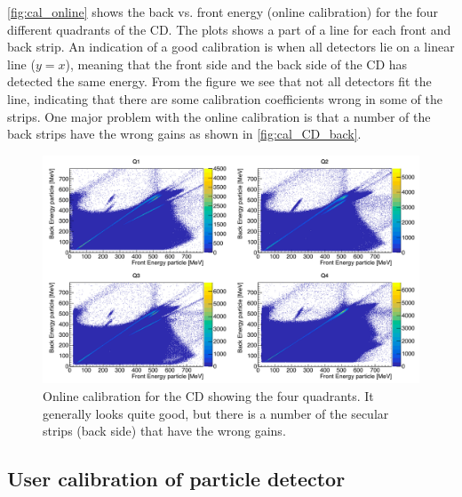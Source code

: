 \documentclass[twoside,english]{uiofysmaster/uiofysmaster}
\begin{document}
\autoref{fig:cal_online} shows the back vs. front energy (online calibration) for the four different quadrants of the CD. 
The plots shows a part of a line for each front and back strip. An indication of a good calibration is when all detectors lie on a linear line ($y = x$), meaning that the front side and the back side of the CD has detected the same energy. 
From the figure we see that not all detectors fit the line, indicating that there are some calibration coefficients wrong in some of the strips.
One major problem with the online calibration is that a number of the back strips have the wrong gains as shown in \autoref{fig:cal_CD_back}.

\begin{figure}[ht]
	\centering
	\includegraphics[width=\textwidth]{../Plots/plotting/E_f_b_Q1-4-online.png}
	\caption{Online calibration for the CD showing the four quadrants. It generally looks quite good, but there is a number of the secular strips (back side) that have the wrong gains.}
	\label{fig:cal_online}
\end{figure}



\subsection{User calibration of particle detector}
\end{document}

